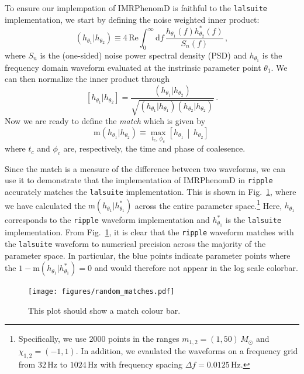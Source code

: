 \documentclass[twocolumn]{aastex631}
\newcommand{\ripple}{\texttt{ripple}\xspace}
\newcommand{\lalsuite}{\texttt{lalsuite}\xspace}
\begin{document}
To ensure our implempation of IMRPhenomD is faithful to the \lalsuite implementation, we start by defining the noise weighted inner product:
\begin{equation}
    \left(h_{\theta_1}|h_{\theta_2}\right) \equiv 4 \, \mathrm{Re} \int^{\infty}_{0} \mathrm{d} f \, \frac{ h_{\theta_1}(f) h^*_{\theta_2}(f)}{S_n(f)}\, ,
\end{equation}
where $S_n$ is the (one-sided) noise power spectral density (PSD) and $h_{\theta_1}$ is the frequency domain waveform evaluated at the instrinsic parameter point $\theta_1$.
We can then normalize the inner product through
\begin{equation}
    \left[h_{\theta_1}|h_{\theta_2}\right] = \frac{\left(h_{\theta_1}|h_{\theta_2}\right)}{\sqrt{\left(h_{\theta_1}|h_{\theta_1}\right)\left(h_{\theta_2}|h_{\theta_2}\right)}}\, .
\end{equation}
Now we are ready to define the \textit{match} which is given by 
\begin{equation}
    \mathrm{m}(h_{\theta_1}|h_{\theta_2}) \equiv \max_{t_c,\, \phi_c} \left[h_{\theta_1} \, \middle| \, h_{\theta_2} \right]\,
\end{equation}
where $t_c$ and $\phi_c$ are, respectively, the time and phase of coalesence.

Since the match is a measure of the difference between two waveforms, we can use it to demonstrate that the implementation of IMRPhenomD in \ripple accurately matches the \lalsuite implementation.
This is shown in Fig.~\ref{fig:match}, where we have calculated the $\mathrm{m}(h_{\theta_1}|h^{*}_{\theta_1})$ across the entire parameter space.\footnote{
    Specifically, we use 2000 points in the ranges $m_{1,2} = (1,50)\,M_{\odot}$ and $\chi_{1,2} = (-1,1)$. In addition, we evaulated the waveforms on a frequency grid from $32\,$Hz to $1024\,$Hz with frequency spacing $\Delta f = 0.0125 \,$Hz.
}
Here, $h_{\theta_1}$ corresponds to the \ripple waveform implementation and $h^{*}_{\theta_1}$ is the \lalsuite implementation. 
From Fig.~\ref{fig:match}, it is clear that the \ripple waveform matches with the \lalsuite waveform to numerical precision across the majority of the parameter space.
In particular, the blue points indicate parameter points where the $1-\mathrm{m}(h_{\theta_1}|h^{*}_{\theta_1})=0$ and would therefore not appear in the log scale colorbar.
\begin{figure}[ht!]
    \begin{centering}
        \texttt{[image: figures/random\_matches.pdf]}
        \caption{
            This plot should show a match colour bar.
        }
        \label{fig:match}
    \end{centering}
\end{figure}
\end{document}
